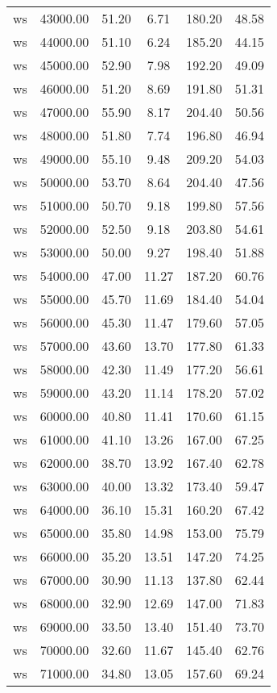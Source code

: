 \begin{table}[ht]
\begin{table}[ht]
\begin{tabular}{|cccccc}
  ws & 43000.00 & 51.20 & 6.71 & 180.20 & 48.58 \\ 
  ws & 44000.00 & 51.10 & 6.24 & 185.20 & 44.15 \\ 
  ws & 45000.00 & 52.90 & 7.98 & 192.20 & 49.09 \\ 
  ws & 46000.00 & 51.20 & 8.69 & 191.80 & 51.31 \\ 
  ws & 47000.00 & 55.90 & 8.17 & 204.40 & 50.56 \\ 
  ws & 48000.00 & 51.80 & 7.74 & 196.80 & 46.94 \\ 
  ws & 49000.00 & 55.10 & 9.48 & 209.20 & 54.03 \\ 
  ws & 50000.00 & 53.70 & 8.64 & 204.40 & 47.56 \\ 
  ws & 51000.00 & 50.70 & 9.18 & 199.80 & 57.56 \\ 
  ws & 52000.00 & 52.50 & 9.18 & 203.80 & 54.61 \\ 
  ws & 53000.00 & 50.00 & 9.27 & 198.40 & 51.88 \\ 
  ws & 54000.00 & 47.00 & 11.27 & 187.20 & 60.76 \\ 
  ws & 55000.00 & 45.70 & 11.69 & 184.40 & 54.04 \\ 
  ws & 56000.00 & 45.30 & 11.47 & 179.60 & 57.05 \\ 
  ws & 57000.00 & 43.60 & 13.70 & 177.80 & 61.33 \\ 
  ws & 58000.00 & 42.30 & 11.49 & 177.20 & 56.61 \\ 
  ws & 59000.00 & 43.20 & 11.14 & 178.20 & 57.02 \\ 
  ws & 60000.00 & 40.80 & 11.41 & 170.60 & 61.15 \\ 
  ws & 61000.00 & 41.10 & 13.26 & 167.00 & 67.25 \\ 
  ws & 62000.00 & 38.70 & 13.92 & 167.40 & 62.78 \\ 
  ws & 63000.00 & 40.00 & 13.32 & 173.40 & 59.47 \\ 
  ws & 64000.00 & 36.10 & 15.31 & 160.20 & 67.42 \\ 
  ws & 65000.00 & 35.80 & 14.98 & 153.00 & 75.79 \\ 
  ws & 66000.00 & 35.20 & 13.51 & 147.20 & 74.25 \\ 
  ws & 67000.00 & 30.90 & 11.13 & 137.80 & 62.44 \\ 
  ws & 68000.00 & 32.90 & 12.69 & 147.00 & 71.83 \\ 
  ws & 69000.00 & 33.50 & 13.40 & 151.40 & 73.70 \\ 
  ws & 70000.00 & 32.60 & 11.67 & 145.40 & 62.76 \\ 
  ws & 71000.00 & 34.80 & 13.05 & 157.60 & 69.24 \\ 

\end{tabular}
\end{table}
\end{table}
